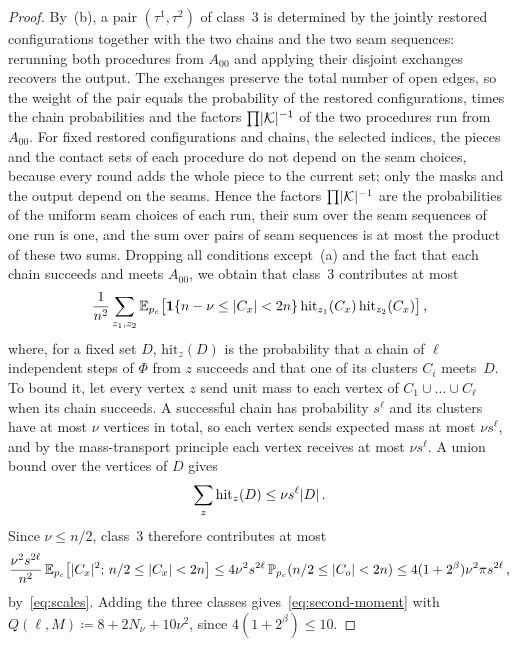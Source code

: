 \begin{proof}
By~(b), a pair $(\tau^1,\tau^2)$ of class~3 is determined by the jointly restored configurations
together with the two chains and the two seam sequences: rerunning both procedures from $A_{00}$ and
applying their disjoint exchanges recovers the output. The exchanges preserve the total number of open
edges, so the weight of the pair equals the probability of the restored configurations, times the
chain probabilities and the factors $\prod\lvert\mathcal K\rvert^{-1}$ of the two procedures run from
$A_{00}$. For fixed restored configurations and chains, the selected indices, the pieces and the contact
sets of each procedure do not depend on the seam choices, because every round adds the whole piece to
the current set; only the masks and the output depend on the seams. Hence the factors
$\prod\lvert\mathcal K\rvert^{-1}$ are the probabilities of the uniform seam choices of each run, their sum
over the seam sequences of one run is one, and the sum over pairs of seam sequences is at most the
product of these two sums. Dropping
all conditions except~(a) and the fact that each chain succeeds and meets $A_{00}$, we obtain that
class~3 contributes at most
\begin{equation*}
  \frac1{n^2}\sum_{z_1,z_2}\mathbb E_{p_c}\bigl[\mathbf{1}\{n-\nu\le\lvert C_x\rvert<2n\}\,
  \mathrm{hit}_{z_1}(C_x)\,\mathrm{hit}_{z_2}(C_x)\bigr]\,,
\end{equation*}
where, for a fixed set $D$, $\mathrm{hit}_z(D)$ is the probability that a chain of $\ell$ independent
steps of $\Phi$ from $z$ succeeds and that one of its clusters $C_i$ meets~$D$. To bound it, let every
vertex $z$ send unit mass to each vertex of $C_1\cup\dots\cup C_\ell$ when its chain succeeds. A successful
chain has probability $s^\ell$ and its clusters have at most $\nu$ vertices in total, so each vertex sends
expected mass at most $\nu s^\ell$, and by the mass-transport principle each vertex receives at most
$\nu s^\ell$. A union bound over the vertices of $D$ gives
\begin{equation*}
  \sum_z\mathrm{hit}_z(D)\le\nu s^\ell\lvert D\rvert\,.
\end{equation*}
Since $\nu\le n/2$, class~3 therefore contributes at most
\begin{equation*}
  \frac{\nu^2s^{2\ell}}{n^2}\,\mathbb E_{p_c}\bigl[\lvert C_x\rvert^2;\,n/2\le\lvert C_x\rvert<2n\bigr]
  \le4\nu^2s^{2\ell}\,\mathbb P_{p_c}(n/2\le\lvert C_o\rvert<2n)\le4(1+2^\beta)\nu^2\pi s^{2\ell}\,,
\end{equation*}
by~\eqref{eq:scales}. Adding the three classes gives~\eqref{eq:second-moment} with
$Q(\ell,M)\coloneqq8+2N_\nu+10\nu^2$, since $4(1+2^\beta)\le10$.
\end{proof}

